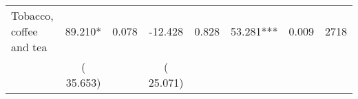 \begin{tabular}{l*{7}{c}}
 Tobacco, coffee and tea       &             89.210*       &        0.078  &            -12.428       &        0.828  &             53.281***       &              0.009 &  2718 \\ 
                       &       (      35.653)             &                               &       (      25.071)                     &                               &                                               &                                &                      \\ 

\hline \end{tabular}